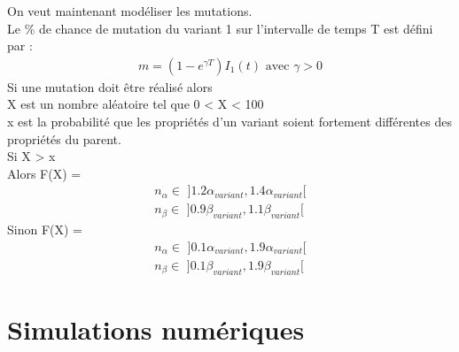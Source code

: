 \documentclass{article}
\begin{document}
\noindent
On veut maintenant modéliser les mutations.\\
Le \% de chance de mutation du variant 1 sur l'intervalle de temps T est défini par :
\begin{align}
    m = (1-e^{\gamma T})I_1(t) \text{ avec }\gamma > \text{0}
\end{align}
\noindent
Si une mutation doit être réalisé alors \\
\noindent
X est un nombre aléatoire tel que 0 < X < 100 \\
x est la probabilité que les propriétés d'un variant soient fortement différentes des propriétés du parent.\\
Si X > x \\
Alors F(X) =
\begin{align}
    n_\alpha \in \text{ ]}1.2\alpha_{variant}, 1.4\alpha_{variant}\text{[}  \\
    n_\beta \in \text{ ]}0.9\beta_{variant}, 1.1\beta_{variant}\text{[}
\end{align}
\noindent
Sinon F(X) = \\
\begin{align}
    n_\alpha \in \text{ ]}0.1\alpha_{variant}, 1.9\alpha_{variant}\text{[} \\
    n_\beta \in \text{ ]}0.1\beta_{variant}, 1.9\beta_{variant}\text{[}
\end{align}


\section{Simulations numériques}
\end{document}
